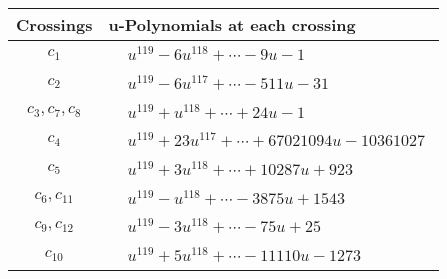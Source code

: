 \documentclass[1p]{elsarticle_modified}
\theoremstyle{definition}
\begin{document}
\begin{tabular}{m{50pt}|m{274pt}}
Crossings & \hspace{64pt}u-Polynomials at each crossing \\
\hline $$\begin{aligned}c_{1}\end{aligned}$$&$\begin{aligned}
&u^{119}-6 u^{118}+\cdots-9 u-1
\end{aligned}$\\
\hline $$\begin{aligned}c_{2}\end{aligned}$$&$\begin{aligned}
&u^{119}-6 u^{117}+\cdots-511 u-31
\end{aligned}$\\
\hline $$\begin{aligned}c_{3},c_{7},c_{8}\end{aligned}$$&$\begin{aligned}
&u^{119}+u^{118}+\cdots+24 u-1
\end{aligned}$\\
\hline $$\begin{aligned}c_{4}\end{aligned}$$&$\begin{aligned}
&u^{119}+23 u^{117}+\cdots+67021094 u-10361027
\end{aligned}$\\
\hline $$\begin{aligned}c_{5}\end{aligned}$$&$\begin{aligned}
&u^{119}+3 u^{118}+\cdots+10287 u+923
\end{aligned}$\\
\hline $$\begin{aligned}c_{6},c_{11}\end{aligned}$$&$\begin{aligned}
&u^{119}- u^{118}+\cdots-3875 u+1543
\end{aligned}$\\
\hline $$\begin{aligned}c_{9},c_{12}\end{aligned}$$&$\begin{aligned}
&u^{119}-3 u^{118}+\cdots-75 u+25
\end{aligned}$\\
\hline $$\begin{aligned}c_{10}\end{aligned}$$&$\begin{aligned}
&u^{119}+5 u^{118}+\cdots-11110 u-1273
\end{aligned}$\\
\hline
\end{tabular}\\~\\
\end{document}
